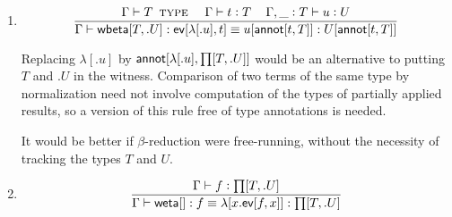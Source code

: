 \documentclass[11pt]{article}
\newcommand{\eqd}{\equiv}
\newcommand{\spc}{{\,\,\,\,\,\,\,}}
\newcommand{\ccolon}[1]{\vcentcolon#1}
\newcommand{\synth}[1]{\vcentcolon(\Rightarrow#1)} %
\newcommand{\ccheck}[1]{\vcentcolon#1}  %
\newcommand{\Type}{\mathop{\text{ \sc type}}}
\newcommand{\ha}[2]{#1[#2]}
\newcommand{\weta}{{\sf weta}}
\newcommand{\annot}{{\sf annot}}
\newcommand{\ev}{{\sf ev}}
\newcommand{\wbeta}{{\sf wbeta}}
\newcommand{\var}{\char`_}
\begin{document}
\begin{enumerate}
For simplicity, assume that $f'$ is $f$, and observe that $\Gamma \vdash
\ha\ev{f',t'} \synth{U[\ha\annot{t,T}]}$ may not be valid, even though $\Gamma
\vdash \ha\ev{f',t'} \synth{U[\ha\annot{t',T}]}$ is.  Nevertheless, $\Gamma \vdash
\ha\ev{f',t'} : U[\ha\annot{t,T}]$ is valid in the underlying type theory where
the witnesses have been forgotten.

\item 
$$\frac{ \Gamma \vdash T \Type \spc \Gamma\vdash t \ccheck{T}\spc \Gamma, \var \ccolon{T}\vdash u \ccheck{U}}{\Gamma\vdash \ha\wbeta{T,.U} : \ha\ev{\ha\lambda{.u},t} \eqd u[\ha\annot{t,T}] : U[\ha\annot{t,T}]}$$

Replacing $\ha\lambda{.u}$ by $\ha\annot{\ha\lambda{.u},\ha\prod{T,.U}}$ would
be an alternative to putting $T$ and $.U$ in the witness.  Comparison of two
terms of the same type by normalization need not involve computation of the
types of partially applied results, so a version of this rule free of type
annotations is needed.

It would be better if $\beta$-reduction were free-running, without the
necessity of tracking the types $T$ and $U$.

\item 
$$\frac{\Gamma\vdash f \ccheck{\ha\prod{T,.U}}}{\Gamma\vdash \ha\weta{} : f \eqd \ha\lambda{x.\ha\ev{f,x}} : \ha\prod{T,.U}}$$ 

\end{enumerate}



\end{document}
